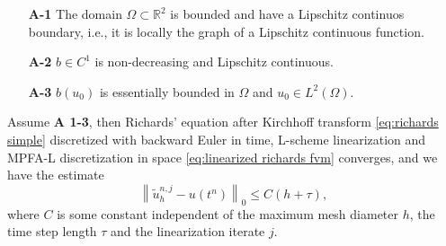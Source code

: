 \documentclass[../Main/main.tex]{subfiles}
\begin{document}
	\begin{itemize}
		\item[\textbf{A-1}] The domain $\Omega\subset \mathbb{R}^2$ is bounded and have a Lipschitz continuos boundary, i.e., it is locally the graph of a Lipschitz continuous function.
		\item[\textbf{A-2}] $b\in C^1$ is non-decreasing and Lipschitz continuous.
		\item[\textbf{A-3}] $b(u_0)$ is essentially bounded in $\Omega$ and $u_0 \in L^2(\Omega)$.
	\end{itemize}
	\begin{theorem}
		Assume \textbf{A 1-3}, then
		Richards' equation after Kirchhoff transform \eqref{eq:richards simple} discretized with backward Euler in time, L-scheme linearization and MPFA-L discretization in space \eqref{eq:linearized richards fvm} converges, and we have the estimate
		\begin{equation}\label{eq:richards_estimate}
			\left \|\tilde{u}_h^{n,j}-u(t^n)\right \|_0 \leq C (h+\tau),
		\end{equation}
		where $C$ is some constant independent of the maximum mesh diameter $h$, the time step length $\tau$ and the linearization iterate $j$.
	\end{theorem}
\end{document}

